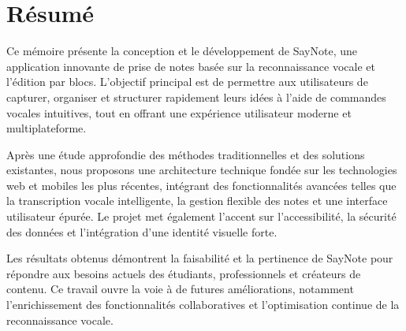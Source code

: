 \chapter*{Résumé}
Ce mémoire présente la conception et le développement de SayNote, une application innovante de prise de notes basée sur la reconnaissance vocale et l’édition par blocs. L’objectif principal est de permettre aux utilisateurs de capturer, organiser et structurer rapidement leurs idées à l’aide de commandes vocales intuitives, tout en offrant une expérience utilisateur moderne et multiplateforme.

Après une étude approfondie des méthodes traditionnelles et des solutions existantes, nous proposons une architecture technique fondée sur les technologies web et mobiles les plus récentes, intégrant des fonctionnalités avancées telles que la transcription vocale intelligente, la gestion flexible des notes et une interface utilisateur épurée. Le projet met également l’accent sur l’accessibilité, la sécurité des données et l’intégration d’une identité visuelle forte.

Les résultats obtenus démontrent la faisabilité et la pertinence de SayNote pour répondre aux besoins actuels des étudiants, professionnels et créateurs de contenu. Ce travail ouvre la voie à de futures améliorations, notamment l’enrichissement des fonctionnalités collaboratives et l’optimisation continue de la reconnaissance vocale.
